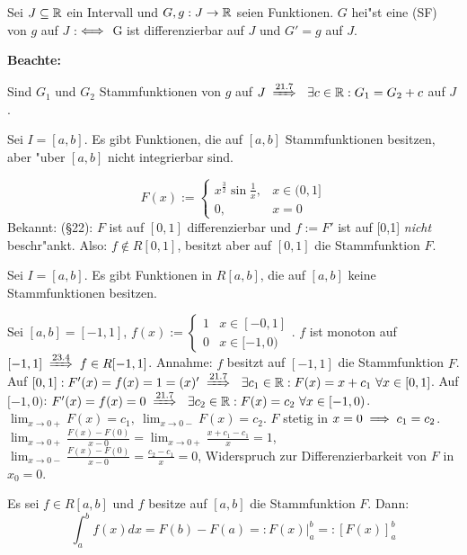 \documentclass[a4paper,twoside,DIV15,BCOR12mm]{scrbook}
\begin{document}
\begin{definition}
Sei $J\subseteq\mathbb{R}$ ein Intervall und $G,g: J\to\mathbb{R}$ seien Funktionen. $G$ hei"st eine  (SF) von $g$ auf $J$ :$\iff$ G ist differenzierbar auf $J$ und $G'=g$ auf $J$.\\
\end{definition}
\textbf{Beachte:}
\begin{liste}
\item Sind $G_1$ und $G_2$ Stammfunktionen von $g$ auf $J \folgtnach{21.7}\ \exists c \in\MdR: G_1=G_2+c$ auf $J$.
\item Sei $I=[a,b]$. Es gibt Funktionen, die auf $[a,b]$ Stammfunktionen besitzen, aber "uber $[a,b]$ nicht integrierbar sind.
\begin{beispiel}
$$F(x) := \begin{cases}
x^{\frac{3}{2}} \sin\frac{1}{x},&x\in(0,1]\\
0,& x=0\end{cases}$$
Bekannt: (§22): $F$ ist auf $[0,1]$ differenzierbar und $f:=F'$ ist auf [0,1] \emph{nicht} beschr"ankt. Also: $f \notin R[0,1]$, besitzt aber auf $[0,1]$ die Stammfunktion $F$.
\end{beispiel}
\item Sei $I=[a,b]$. Es gibt Funktionen in $R[a,b]$, die auf $[a,b]$ keine Stammfunktionen besitzen.
\begin{beispiel}
Sei $[a,b]=[-1,1]$, $f(x):=\begin{cases}
1&x\in[-0,1]\\
0&x\in[-1,0)\end{cases}$. $f$ ist monoton auf $[-1,1]\folgtnach{23.4}f\in R[-1,1]$. Annahme: $f$ besitzt auf $[-1, 1]$ die Stammfunktion $F$. Auf $[0,1]:F'(x)=f(x)=1=(x)'\folgtnach{21.7}\ \exists c_1 \in \MdR: F(x)=x+c_1\ \forall x \in [0,1]$. Auf $[-1, 0)$: $F'(x)=f(x)=0 \folgtnach{21.7}\ \exists c_2 \in \MdR: F(x)=c_2\ \forall x\in [-1,0)$. $\displaystyle\lim_{x\to 0+}F(x)=c_1,\ \displaystyle\lim_{x\to 0-}F(x)=c_2$. $F$ stetig in $x=0\implies c_1=c_2$.$\displaystyle\lim_{x \to 0+}\frac{F(x)-F(0)}{x-0}=\displaystyle\lim_{x\to 0+}\frac{x+c_1-c_1}{x}=1$, $\displaystyle\lim_{x\to 0-}\frac{F(x)-F(0)}{x-0}=\frac{c_2-c_1}{x}=0$, Widerspruch zur Differenzierbarkeit von $F$ in $x_0=0$.
\end{beispiel}
\end{liste}

\begin{satz}
Es sei $f\in R[a,b]$ und $f$ besitze auf $[a,b]$ die Stammfunktion $F$. Dann: 
$$\int_a^bf(x)dx = F(b) - F(a) =: F(x)|_a^b =: [F(x)]_a^b$$
\end{satz}
\end{document}
